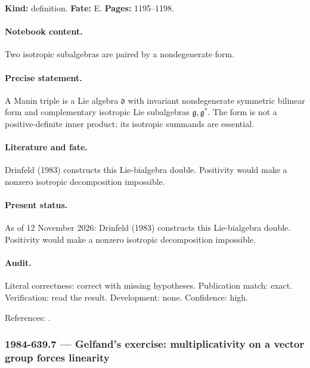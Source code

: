 \label{item:1984-639.6}

\noindent\textbf{Kind:} definition. \textbf{Fate:} E. \textbf{Pages:} 1195--1198.\par

\paragraph{Notebook content.} Two isotropic subalgebras are paired by a nondegenerate form.

\paragraph{Precise statement.} A Manin triple is a Lie algebra \(\mathfrak d\) with invariant nondegenerate symmetric bilinear form and complementary isotropic Lie subalgebras \(\mathfrak g,\mathfrak g^*\). The form is not a positive-definite inner product; its isotropic summands are essential.

\paragraph{Literature and fate.} Drinfeld (1983) constructs this Lie-bialgebra double. Positivity would make a nonzero isotropic decomposition impossible.

\paragraph{Present status.} As of 12 November 2026: Drinfeld (1983) constructs this Lie-bialgebra double. Positivity would make a nonzero isotropic decomposition impossible.

\paragraph{Audit.} Literal correctness: correct with missing hypotheses. Publication match: exact. Verification: read the result. Development: none. Confidence: high.

\noindent References: \citep{drinfeld1983hamiltonian}.\par

\subsubsection{1984-639.7 --- Gelfand's exercise: multiplicativity on a vector group forces linearity}

\label{item:1984-639.7}

